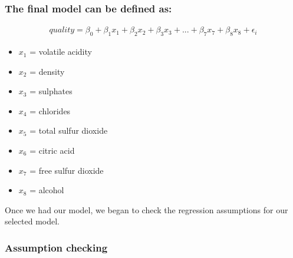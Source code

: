 \documentclass[a4paper,9pt,twocolumn,twoside,]{pinp}
\providecommand{\tightlist}{%
  \setlength{\itemsep}{0pt}\setlength{\parskip}{0pt}}
\begin{document}
\hypertarget{the-final-model-can-be-defined-as}{%
\subsubsection{The final model can be defined
as:}\label{the-final-model-can-be-defined-as}}

\begin{equation}
  \begin{aligned}
  quality = \beta_{0} + \beta_{1}{x_1} + \beta_{2}{x_2} + \beta_{3}{x_3} + ... + \beta_{7}{x_7} + \beta_{8}{x_8} + \epsilon_i
       \label{eqn:model}
  \end{aligned}
\end{equation}

\begin{itemize}
\tightlist
\item
  \(x_1\) = volatile acidity
\item
  \(x_2\) = density
\item
  \(x_3\) = sulphates
\item
  \(x_4\) = chlorides
\item
  \(x_5\) = total sulfur dioxide
\item
  \(x_6\) = citric acid
\item
  \(x_7\) = free sulfur dioxide
\item
  \(x_8\) = alcohol
\end{itemize}

Once we had our model, we began to check the regression assumptions for
our selected model. \pagebreak

\hypertarget{assumption-checking}{%
\subsubsection{Assumption checking}\label{assumption-checking}}
\end{document}

